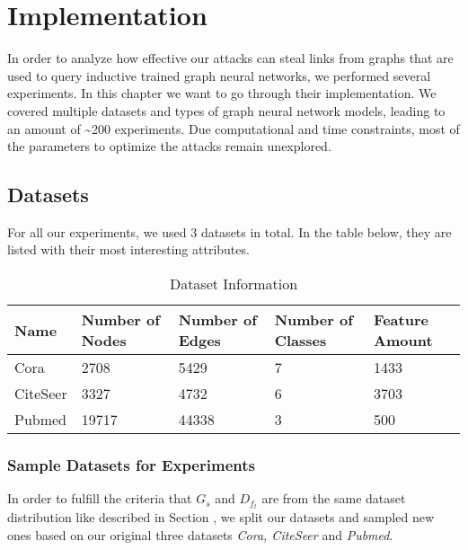 \chapter{Implementation}

  In order to analyze how effective our attacks can steal links from graphs that are used to query inductive trained graph neural networks, we performed several experiments.
  In this chapter we want to go through their implementation.
  We covered multiple datasets and types of graph neural network models, leading to an amount of \textasciitilde200 experiments.
  Due computational and time constraints, most of the parameters to optimize the attacks remain unexplored.

  \section{Datasets}

    For all our experiments, we used 3 datasets in total.
    In the table below, they are listed with their most interesting attributes.

    \vspace{0.48cm}
    \begin{table}[!h]
      \centering
      \footnotesize
      \begin{tabular}{l|l|l|l|l}
        \toprule
        Name & Number of Nodes & Number of Edges & Number of Classes & Feature Amount \\
        \midrule
        Cora & 2708            & 5429            & 7                 & 1433 \\
        CiteSeer & 3327        & 4732            & 6                 & 3703 \\
        Pubmed & 19717         & 44338           & 3                 & 500 \\
        \bottomrule
      \end{tabular}
      \caption{Dataset Information}
      \label{table:datasets}
    \end{table}

    \subsection{Sample Datasets for Experiments}

      In order to fulfill the criteria that $G_s$ and $D_{f_t}$ are from the same dataset distribution like described in Section , we split our datasets and sampled new ones based on our original three datasets \emph{Cora, CiteSeer} and \emph{Pubmed}.

